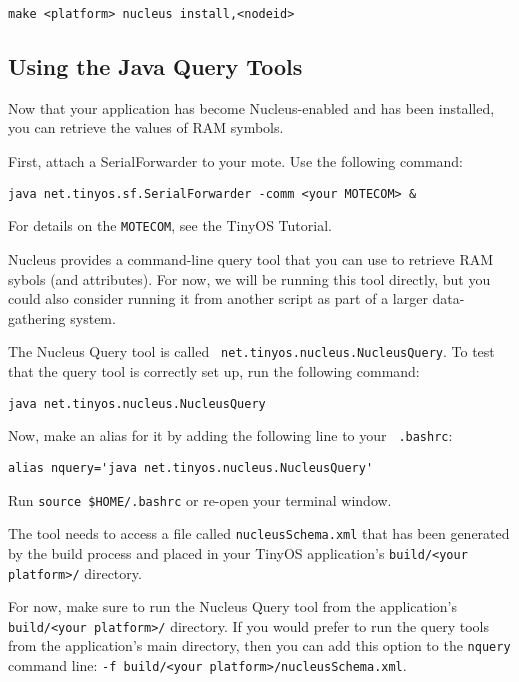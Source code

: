 \documentclass{article}
\begin{document}
\begin{verbatim}
make <platform> nucleus install,<nodeid>
\end{verbatim}

\subsection{Using the Java Query Tools}
\label{sec:ram-tools}

Now that your application has become Nucleus-enabled and has been
installed, you can retrieve the values of RAM symbols.

First, attach a SerialForwarder to your mote. Use the following
command:

\begin{verbatim}
java net.tinyos.sf.SerialForwarder -comm <your MOTECOM> &
\end{verbatim}

For details on the {\tt MOTECOM}, see the TinyOS Tutorial.

Nucleus provides a command-line query tool that you can use to
retrieve RAM sybols (and attributes). For now, we will be running this
tool directly, but you could also consider running it from another
script as part of a larger data-gathering system.
 
The Nucleus Query tool is called {\tt
net.tinyos.nucleus.NucleusQuery}. To test that the query tool is
correctly set up, run the following command:

\begin{verbatim}
java net.tinyos.nucleus.NucleusQuery
\end{verbatim}

Now, make an alias for it by adding the following line to your {\tt
.bashrc}:

\begin{verbatim}
alias nquery='java net.tinyos.nucleus.NucleusQuery'
\end{verbatim}

Run {\tt source \$HOME/.bashrc} or re-open your terminal window.

The tool needs to access a file called {\tt nucleusSchema.xml} that
has been generated by the build process and placed in your TinyOS
application's {\tt build/<your platform>/} directory.

For now, make sure to run the Nucleus Query tool from the
application's {\tt build/<your platform>/} directory. If you would prefer
to run the query tools from the application's main directory, then you
can add this option to the {\tt nquery} command line: {\tt -f build/<your
platform>/nucleusSchema.xml}.
\end{document}
